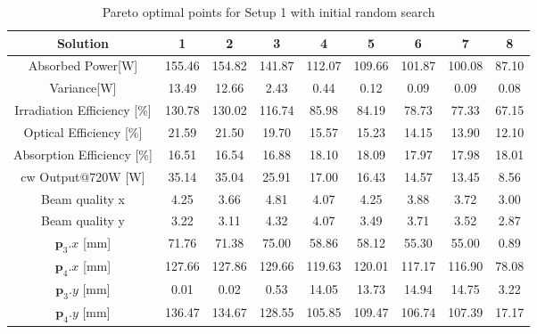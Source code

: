 \documentclass[a4paper,10pt]{article}
\renewcommand{\vec}[1]{\mathbf{#1}}
\begin{document}
    \begin{table}
    \centering
    \setlength\tabcolsep{2pt}
    \renewcommand{\arraystretch}{1.5}
    \begin{tabular}{| c | c | c | c | c | c | c | c | c |}
        \hline
        Solution      &1&2&3&4&5&6&7&8\\
        \hline
        Absorbed Power[W] &155.46&154.82&141.87&112.07&109.66&101.87&100.08&87.10\\
        \hline
        Variance[W] &13.49&12.66&2.43&0.44&0.12&0.09&0.09&0.08\\
        \hline
        Irradiation Efficiency [\%]&130.78&130.02&116.74&85.98&84.19&78.73&77.33&67.15\\
        \hline
        Optical Efficiency [\%]&21.59&21.50&19.70&15.57&15.23&14.15&13.90&12.10\\
        \hline
        Absorption Efficiency [\%]&16.51&16.54&16.88&18.10&18.09&17.97&17.98&18.01\\
        \hline
        cw Output@720W [W]  &35.14&35.04&25.91&17.00&16.43&14.57&13.45&8.56\\
        \hline
        Beam quality x&4.25&3.66&4.81&4.07&4.25&3.88&3.72&3.00\\
        \hline
        Beam quality y&3.22&3.11&4.32&4.07&3.49&3.71&3.52&2.87\\
        \hline
        $\vec{p}_3.x$ [mm]&71.76&71.38&75.00&58.86&58.12&55.30&55.00&0.89\\ 
        \hline
        $\vec{p}_4.x$ [mm]&127.66&127.86&129.66&119.63&120.01&117.17&116.90&78.08\\ 
        \hline
        $\vec{p}_3.y$ [mm]&0.01&0.02&0.53&14.05&13.73&14.94&14.75&3.22\\ 
        \hline
        $\vec{p}_4.y$ [mm]&136.47&134.67&128.55&105.85&109.47&106.74&107.39&17.17\\ 
        \hline
    \end{tabular}
    \label{tab:setup1_results}
    \caption{Pareto optimal points for Setup 1 with initial random search}
    \end{table}
\end{document}
